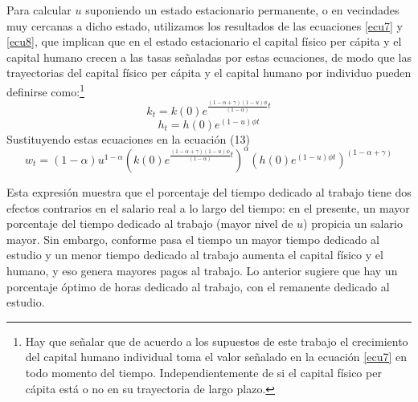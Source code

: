 \documentclass[12pt,a4paper]{report}
\newcommand{\suma}{(1-\alpha + \gamma)}
\newcommand{\fphi}{\frac{\suma (1-u)\phi}{(1-\alpha)}}
\begin{document}
	\addtocounter{footnote}{12}
	
	Para calcular $u$ suponiendo un estado estacionario permanente, o en vecindades muy cercanas a dicho estado, utilizamos los resultados de las ecuaciones \ref{ecu7} y \ref{ecu8}, que implican que en el estado estacionario el capital físico per cápita y el capital humano crecen a las tasas señaladas por estas ecuaciones, de modo que las trayectorias del capital físico per cápita y el capital humano por individuo pueden definirse como:\footnote{Hay que señalar que de acuerdo a los supuestos de este trabajo el crecimiento del capital humano individual toma el valor señalado en la ecuación \ref{ecu7} en todo momento del tiempo. Independientemente de si el capital físico per cápita está o no en su trayectoria de largo plazo.}
	\begin{equation}\label{ecu14}
		k_t=k(0)e^{\fphi t}
	\end{equation}
	\begin{equation}\label{ecu15}
		h_t=h(0)e^{(1-u)\phi t}
	\end{equation}
	Sustituyendo estas ecuaciones en la ecuación (13)
	\begin{equation}\label{ecu16}
		w_t=(1-\alpha)u^{1-\alpha}(k(0)e^{\fphi t})^\alpha(h(0)e^{(1-u)\phi t})^{\suma}
	\end{equation}
	
	Esta expresión muestra que el porcentaje del tiempo dedicado al trabajo tiene dos efectos contrarios en el salario real a lo largo del tiempo: en el presente, un mayor porcentaje del tiempo dedicado al trabajo (mayor nivel de $u$) propicia un salario mayor. Sin embargo, conforme pasa el tiempo un mayor tiempo dedicado al estudio y un menor tiempo dedicado al trabajo aumenta el capital físico y el humano, y eso genera mayores pagos al trabajo. Lo anterior sugiere que hay un porcentaje óptimo de horas dedicado al trabajo, con el remanente dedicado al estudio.
	
\end{document}
